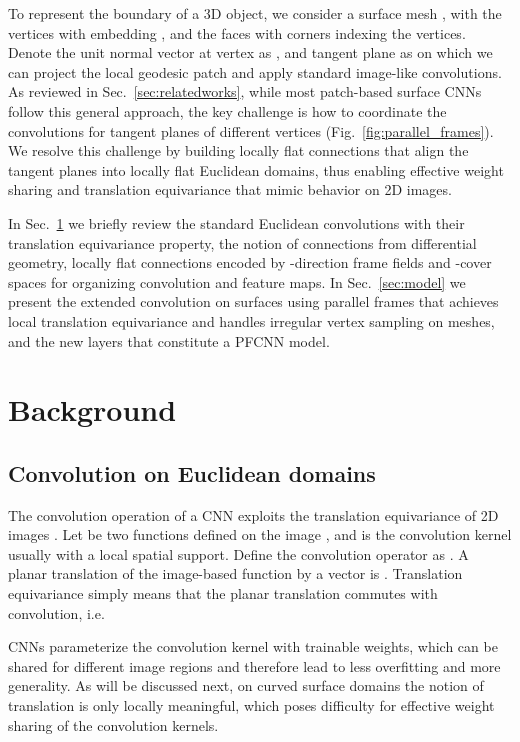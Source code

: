 \documentclass[10pt,twocolumn,letterpaper]{article}
\begin{document}
To represent the boundary of a 3D object, we consider a surface mesh , with  the vertices with embedding , and  the faces with corners indexing the vertices.
Denote the unit normal vector at vertex  as , and tangent plane as  on which we can project the local geodesic patch and apply standard image-like convolutions.
As reviewed in Sec.~\ref{sec:relatedworks}, while most patch-based surface CNNs follow this general approach, the key challenge is how to coordinate the convolutions for tangent planes of different vertices (Fig.~\ref{fig:parallel_frames}).
We resolve this challenge by building locally flat connections that align the tangent planes into locally flat Euclidean domains, thus enabling effective weight sharing and translation equivariance that mimic behavior on 2D images.

In Sec.~\ref{sec:background} we briefly review the standard Euclidean convolutions with their translation equivariance property, the notion of connections from differential geometry, locally flat connections encoded by -direction frame fields and -cover spaces for organizing convolution and feature maps.
In Sec.~\ref{sec:model} we present the extended convolution on surfaces using parallel frames that achieves local translation equivariance and handles irregular vertex sampling on meshes, and the new layers that constitute a PFCNN model.

\section{Background}
\label{sec:background}

\subsection{Convolution on Euclidean domains}
The convolution operation of a CNN exploits the translation equivariance of 2D images \cite{LeCun89,LeCun98,GeometricDL2017}.
Let  be two functions defined on the image , and  is the convolution kernel usually with a local spatial support.
Define the convolution operator  as .
A planar translation of the image-based function by a vector  is .
Translation equivariance simply means that the planar translation commutes with convolution, i.e.

CNNs parameterize the convolution kernel with trainable weights, which can be shared for different image regions and therefore lead to less overfitting and more generality.
As will be discussed next, on curved surface domains the notion of translation is only locally meaningful, which poses difficulty for effective weight sharing of the convolution kernels.
\end{document}
